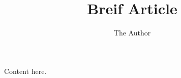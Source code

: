 \documentclass[11pt]{amsart}
\title{Breif Article}
\author{The Author}
\begin{document}
\maketitle

Content here.
\end{document}
